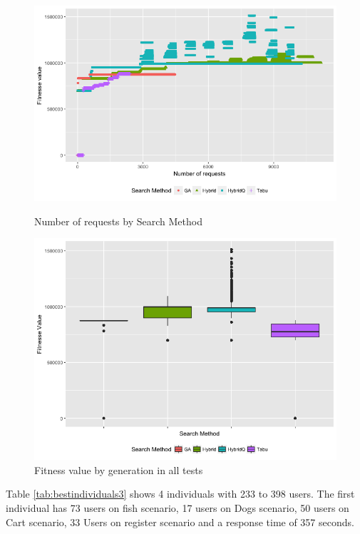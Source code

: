 \begin{figure}[h]
\begin{minipage}{.5\textwidth}
\centering
\includegraphics[width=1\textwidth]{./images/experiment3-3.png}
\caption{Number of requests by Search Method}
\label{fig:numberofrequestsbysearchmethod3}
\end{minipage}
\begin{minipage}{.5\textwidth}
\centering
\includegraphics[width=1\textwidth]{./images/experiment3-4.png}
\caption{Fitness value by generation in all tests}
\label{fig:boxplot3}
\end{minipage}

\end{figure}

Table \ref{tab:bestindividuals3} shows 4 individuals with 233 to 398 users.  The first individual has 73 users on fish scenario, 17 users on Dogs scenario, 50 users on Cart scenario, 33 Users on register scenario  and a response time of 357 seconds. 

